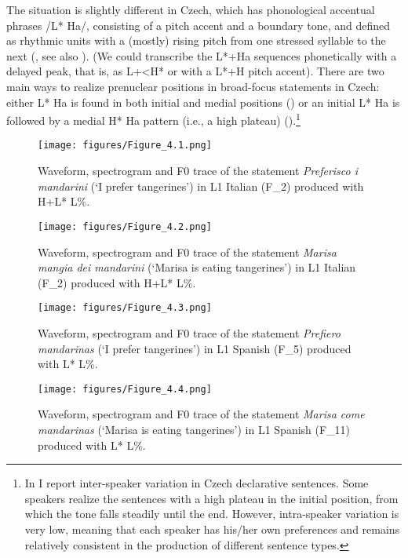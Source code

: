The situation is slightly different in Czech, which has phonological accentual phrases /L* Ha/, consisting of a pitch accent and a boundary tone, and defined as rhythmic units with a (mostly) rising pitch from one stressed syllable to the next (\citealt{PeškováEtAl2018}, see also ). (We could transcribe the L*+Ha sequences phonetically with a delayed peak, that is, as L+<H* or with a L*+H pitch accent). There are two main ways to realize prenuclear positions in broad-focus statements in Czech: either L* Ha is found in both initial and medial positions () or an initial L* Ha is followed by a medial H* Ha pattern (i.e., a high plateau) ().{\footnote{In \citet{PeškováForthcoming} I report inter-speaker variation in Czech declarative sentences. Some speakers realize the sentences with a high plateau in the initial position, from which the tone falls steadily until the end. However, intra-speaker variation is very low, meaning that each speaker has his/her own preferences and remains relatively consistent in the production of different sentence types.}}


\begin{figure}[p]
\texttt{[image: figures/Figure\_4.1.png]}
\caption{Waveform, spectrogram and F0 trace of the statement \textit{Preferisco i mandarini} (‘I prefer tangerines’) in L1 Italian \mbox{(F\_2)} produced with H+L* L\%.}
\label{fig:4.1}
\end{figure}

\begin{figure}[p]
\texttt{[image: figures/Figure\_4.2.png]}
\caption{Waveform, spectrogram and F0 trace of the statement \textit{Marisa mangia dei mandarini} (‘Marisa is eating tangerines’) in L1 Italian \mbox{(F\_2)} produced with H+L* L\%.}
\label{fig:4.2}
\end{figure}

\begin{figure}[p]
\texttt{[image: figures/Figure\_4.3.png]}
\caption{Waveform, spectrogram and F0 trace of the statement \textit{Prefiero mandarinas} (‘I prefer tangerines’) in L1 Spanish \mbox{(F\_5)} produced with L* L\%.}
\label{fig:4.3}
\end{figure}

\begin{figure}[p]
\texttt{[image: figures/Figure\_4.4.png]}
\caption{Waveform, spectrogram and F0 trace of the statement \textit{Marisa come mandarinas} (‘Marisa is eating tangerines’) in L1 Spanish \mbox{(F\_11)} produced with L* L\%.}
\label{fig:4.4}
\end{figure}

